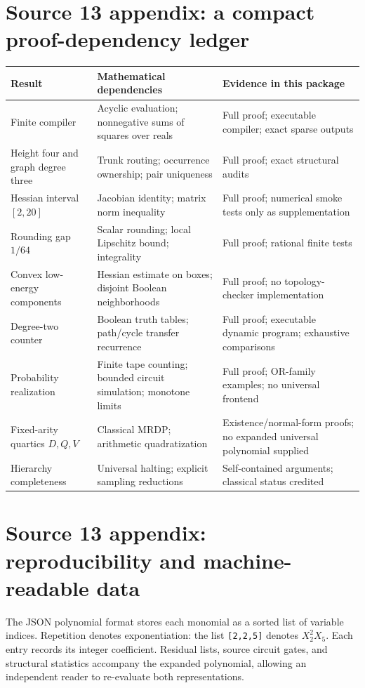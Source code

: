 \documentclass[11pt,letterpaper]{article}
\numberwithin{equation}{section}
\theoremstyle{definition}
\theoremstyle{remark}
\begin{document}
\section{Source 13 appendix: a compact proof-dependency ledger}
\begin{longtable}{>{\raggedright\arraybackslash}p{}
>{\raggedright\arraybackslash}p{}
>{\raggedright\arraybackslash}p{}}
\toprule
Result & Mathematical dependencies & Evidence in this package\\
\midrule
\endhead
Finite compiler & Acyclic evaluation; nonnegative sums of squares over reals &
Full proof; executable compiler; exact sparse outputs\\
Height four and graph degree three & Trunk routing; occurrence ownership;
pair uniqueness & Full proof; exact structural audits\\
Hessian interval $[2,20]$ & Jacobian identity; matrix norm inequality &
Full proof; numerical smoke tests only as supplementation\\
Rounding gap $1/64$ & Scalar rounding; local Lipschitz bound; integrality &
Full proof; rational finite tests\\
Convex low-energy components & Hessian estimate on boxes; disjoint Boolean
neighborhoods & Full proof; no topology-checker implementation\\
Degree-two counter & Boolean truth tables; path/cycle transfer recurrence &
Full proof; executable dynamic program; exhaustive comparisons\\
Probability realization & Finite tape counting; bounded circuit simulation;
monotone limits & Full proof; OR-family examples; no universal frontend\\
Fixed-arity quartics $D,Q,V$ & Classical MRDP; arithmetic quadratization &
Existence/normal-form proofs; no expanded universal polynomial supplied\\
Hierarchy completeness & Universal halting; explicit sampling reductions &
Self-contained arguments; classical status credited\\
\bottomrule
\end{longtable}

\section{Source 13 appendix: reproducibility and machine-readable data}
The JSON polynomial format stores each monomial as a sorted list of
variable indices. Repetition denotes exponentiation: the list
\texttt{[2,2,5]} denotes $X_2^2X_5$. Each entry records its integer
coefficient. Residual lists, source circuit gates, and structural
statistics accompany the expanded polynomial, allowing an independent
reader to re-evaluate both representations.
\end{document}
